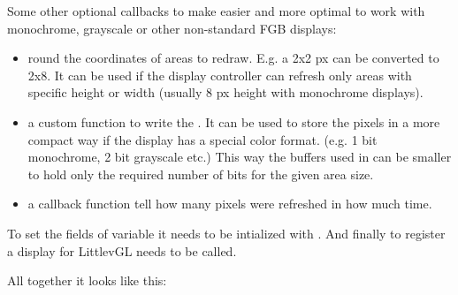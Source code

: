 \documentclass[letterpaper,10pt,english]{sphinxmanual}
\begin{document}
Some other optional callbacks to make easier and more optimal to work with monochrome, grayscale or other non-standard FGB displays:
\begin{itemize}
\item {} 
 round the coordinates of areas to redraw. E.g. a 2x2 px can be converted to 2x8.
It can be used if the display controller can refresh only areas with specific height or width (usually 8 px height with monochrome displays).

\item {} 
 a custom function to write the .
It can be used to store the pixels in a more compact way if the display has a special color format. (e.g. 1 bit monochrome, 2  bit grayscale etc.)
This way the buffers used in  can be smaller to hold only the required number of bits for the given area size.

\item {} 
 a callback function tell how many pixels were refreshed in how much time.

\end{itemize}

To set the fields of  variable it needs to be intialized with .
And finally to register a display for LittlevGL  needs to be called.

All together it looks like this:

\begin{sphinxVerbatim}[commandchars=\\\{\}]
                      
                
                  
              
      
       
\end{sphinxVerbatim}
\end{document}
